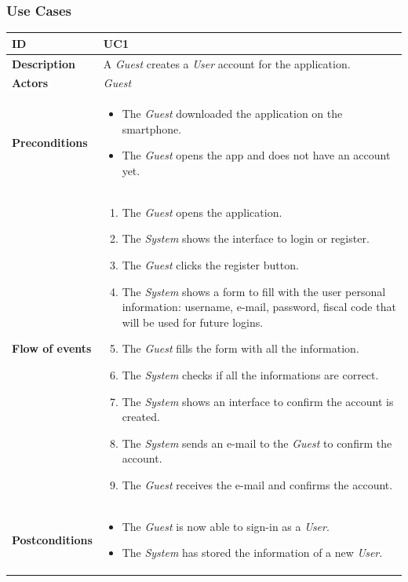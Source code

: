 \documentclass {article}
\begin{document}
	\subsubsection{Use Cases}
	\begin{longtable}{| p{3 cm} | p{10.5 cm} |} 
			\hline
			{\bf ID} & UC1 \\
			\hline
			{\bf Description} & A {\it Guest} creates a {\it User} account for the application.
			\\
			\hline
			{\bf Actors} & {\it Guest}\\
			\hline
			{\bf Preconditions} & 	
			\begin{itemize}
					\item The {\it Guest} downloaded the application on the smartphone.
					\item The {\it Guest} opens the app and does not have an account yet.
				\end{itemize}	
			\\
			\hline
			{\bf Flow of events} &	
			\begin{enumerate}
				\item The {\it Guest} opens the application.
				\item The {\it System} shows the interface to login or register.
				\item The {\it Guest} clicks the register button.
				\item The {\it System} shows a form to fill with the user personal information: username, e-mail, password, fiscal code that will be used for future logins.
				\item The {\it Guest} fills the form with all the information.
				\item The {\it System} checks if all the informations are correct.
				\item The {\it System} shows an interface to confirm the account is created. 
				\item The {\it System} sends an e-mail to the {\it Guest} to confirm the account.
				\item The {\it Guest} receives the e-mail and confirms the account.
			\end{enumerate}
			\\
			\hline
			{\bf Postconditions} & 
			\begin{itemize}
				\item The {\it Guest} is now able to sign-in as a {\it User}.
				\item The {\it System} has stored the information of a new {\it User}.

\end{itemize}
\end{longtable}
\end{document}
